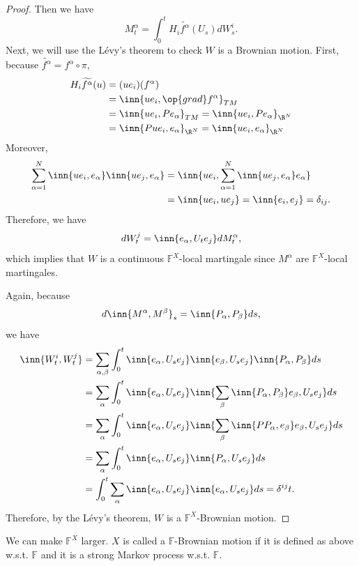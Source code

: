 \begin{proof}
    Then we have
    \begin{equation*}
        M^\alpha_t = \int_0^t H_i\widetilde{f^\alpha}(U_s)dW^i_s.
    \end{equation*}
    Next, we will use the L\'evy's theorem to check $W$ is a Brownian motion. First, because $\widetilde{f^\alpha} = f^\alpha \circ \pi$,
    \begin{align*}
        H_i\widetilde{f^\alpha}(u) &= (ue_i)(f^\alpha) \\
        &= \inn{ue_i,\op{grad}f^\alpha}_{TM} \\
        &= \inn{ue_i,Pe_\alpha}_{TM} =  \inn{ue_i,Pe_\alpha}_{\R^N}\\
        &= \inn{Pue_i,e_\alpha}_{\R^N} = \inn{ue_i,e_\alpha}_{\R^N}
    \end{align*}
    Moreover,
    \begin{align*}
        \sum_{\alpha = 1}^N\inn{ue_i,e_\alpha}\inn{ue_j,e_\alpha} &= \inn{ue_i,\sum_{\alpha = 1}^N\inn{ue_j,e_\alpha}e_\alpha} \\
        &=\inn{ue_i,ue_j} = \inn{e_i,e_j} = \delta_{ij}.
    \end{align*}
    Therefore, we have
    \begin{equation*}
        dW^j_t = \inn{e_\alpha,U_te_j}dM^\alpha_t,
    \end{equation*}
    which implies that $W$ is a continuous $\mathbb{F}^X$-local martingale since $M^\alpha$ are $\mathbb{F}^X$-local martingales.

    Again, because
    \begin{equation*}
        d\inn{M^\alpha,M^\beta}_s = \inn{P_\alpha,P_\beta}ds,
    \end{equation*}
    we have
    \begin{align*}
        \inn{W^i_t,W^j_t} &= \sum_{\alpha,\beta} \int_0^t\inn{e_\alpha,U_se_j}\inn{e_\beta,U_se_j} \inn{P_\alpha,P_\beta}ds \\
        &=  \sum_{\alpha}\int_0^t\inn{e_\alpha,U_se_j} \inn{\sum_\beta\inn{P_\alpha,P_\beta}e_\beta,U_se_j} ds \\
        &= \sum_{\alpha}\int_0^t\inn{e_\alpha,U_se_j} \inn{\sum_\beta\inn{PP_\alpha,e_\beta}e_\beta,U_se_j} ds \\
        &= \sum_{\alpha}\int_0^t\inn{e_\alpha,U_se_j} \inn{P_\alpha,U_se_j} ds \\
        &= \int_0^t\sum_{\alpha}\inn{e_\alpha,U_se_j} \inn{e_\alpha,U_se_j} ds =\delta^{ij}t.
    \end{align*}
    Therefore, by the L\'evy's theorem, $W$ is a $\mathbb{F}^X$-Brownian motion.
\end{proof}
\begin{rmk}
    We can make $\mathbb{F}^X$ larger. $X$ is called a $\mathbb{F}$-Brownian motion if it is defined as above w.s.t. $\mathbb{F}$ and it is a strong Markov process w.s.t. $\mathbb{F}$.
\end{rmk}

